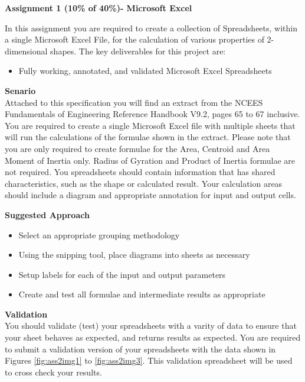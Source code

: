 
	
\begin{flushleft}
\Large\textbf{Assignment 1 (10\% of 40\%)- Microsoft Excel}\\
\end{flushleft}

In this assignment you are required to create a collection of Spreadsheets, within a single Microsoft Excel File, for the calculation of various properties of 2-dimensional shapes.  The key deliverables for this project are:

\begin{itemize}
	\item Fully working, annotated, and validated Microsoft Excel Spreadsheets
\end{itemize}

\textbf{Senario}\\


Attached to this specification you will find an extract from the NCEES Fundamentals of Engineering Reference Handbook V9.2, pages 65 to 67 inclusive.  You are required to create a single Microsoft Excel file with multiple sheets that will run the calculations of the formulae shown in the extract.  Please note that you are only required to create formulae for the Area, Centroid and Area Moment of Inertia only.  Radius of Gyration and Product of Inertia formulae are not required.  You spreadsheets should contain information that has shared characteristics, such as the shape or calculated result.  Your calculation areas should include a diagram and appropriate annotation for input and output cells.


\vspace{.5cm}

\textbf{Suggested Approach}

\begin{itemize}
	\item Select an appropriate grouping methodology
	\item Using the snipping tool, place diagrams into sheets as necessary
	\item Setup labels for each of the input and output parameters
	\item Create and test all formulae and intermediate results as appropriate
\end{itemize}

\textbf{Validation}\\
You should validate (test) your spreadsheets with a varity of data to ensure that your sheet behaves as expected, and returns results as expected.  You are required to submit a validation version of your spreadsheets with the data shown in Figures \ref{fig:ass2img1} to \ref{fig:ass2img3}.  This validation spreadsheet will be used to cross check your results.


